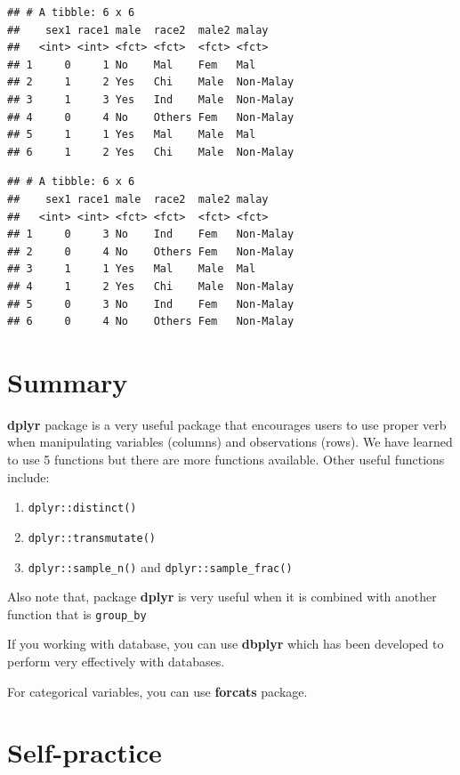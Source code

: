 \documentclass[
]{book}
\providecommand{\tightlist}{%
  \setlength{\itemsep}{0pt}\setlength{\parskip}{0pt}}
\begin{document}
\begin{verbatim}
## # A tibble: 6 x 6
##    sex1 race1 male  race2  male2 malay    
##   <int> <int> <fct> <fct>  <fct> <fct>    
## 1     0     1 No    Mal    Fem   Mal      
## 2     1     2 Yes   Chi    Male  Non-Malay
## 3     1     3 Yes   Ind    Male  Non-Malay
## 4     0     4 No    Others Fem   Non-Malay
## 5     1     1 Yes   Mal    Male  Mal      
## 6     1     2 Yes   Chi    Male  Non-Malay
\end{verbatim}

\begin{verbatim}
## # A tibble: 6 x 6
##    sex1 race1 male  race2  male2 malay    
##   <int> <int> <fct> <fct>  <fct> <fct>    
## 1     0     3 No    Ind    Fem   Non-Malay
## 2     0     4 No    Others Fem   Non-Malay
## 3     1     1 Yes   Mal    Male  Mal      
## 4     1     2 Yes   Chi    Male  Non-Malay
## 5     0     3 No    Ind    Fem   Non-Malay
## 6     0     4 No    Others Fem   Non-Malay
\end{verbatim}

\hypertarget{summary}{%
\section{Summary}\label{summary}}

\textbf{dplyr} package is a very useful package that encourages users to use proper verb when manipulating variables (columns) and observations (rows). We have learned to use 5 functions but there are more functions available. Other useful functions include:

\begin{enumerate}
\def\labelenumi{\arabic{enumi}.}
\tightlist
\item
  \texttt{dplyr::distinct()}
\item
  \texttt{dplyr::transmutate()}
\item
  \texttt{dplyr::sample\_n()} and \texttt{dplyr::sample\_frac()}
\end{enumerate}

Also note that, package \textbf{dplyr} is very useful when it is combined with another function that is \texttt{group\_by}

If you working with database, you can use \textbf{dbplyr} which has been developed to perform very effectively with databases.

For categorical variables, you can use \textbf{forcats} package.

\hypertarget{self-practice}{%
\section{Self-practice}\label{self-practice}}
\end{document}
